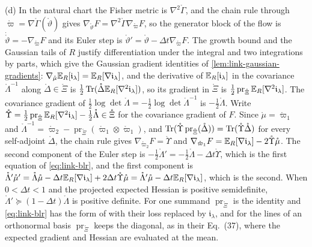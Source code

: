 (d) In the natural chart the Fisher metric is $\nabla^2\mathring\Gamma$, and the chain rule through
$\mathring\varpi=\nabla\mathring\Gamma(\mathring\vartheta)$ gives
$\nabla_{\mathring\vartheta}F=\nabla^2\mathring\Gamma\nabla_{\mathring\varpi}F$, so the generator block of
the flow is $\dot{\mathring\vartheta}=-\nabla_{\mathring\varpi}F$ and its Euler step is
$\mathring\vartheta'=\mathring\vartheta-\Delta t\nabla_{\mathring\varpi}F$. The growth bound and the
Gaussian tails of $R$ justify differentiation under the integral and two integrations by parts, which
give the Gaussian gradient identities of \cref{lem:link-gaussian-gradients}:
$\nabla_{\mathring\mu}\mathbb E_R[\mathfrak i_\lambda]=\mathbb E_R[\nabla\mathfrak i_\lambda]$, and the derivative of
$\mathbb E_R[\mathfrak i_\lambda]$ in the covariance $\mathring\Lambda^{-1}$ along $\mathring\Delta\in\mathring\Xi$ is
$\tfrac12\operatorname{Tr}(\mathring\Delta\mathbb E_R[\nabla^2\mathfrak i_\lambda])$, so its gradient in $\mathring\Xi$ is
$\tfrac12\operatorname{pr}_{\mathring\Xi}\mathbb E_R[\nabla^2\mathfrak i_\lambda]$. The covariance gradient of
$\tfrac12\log\det\mathring\Lambda=-\tfrac12\log\det\mathring\Lambda^{-1}$ is
$-\tfrac12\mathring\Lambda$. Write $\mathring\Upsilon=\tfrac12\operatorname{pr}_{\mathring\Xi}\mathbb E_R[\nabla^2\mathfrak i_\lambda]-\tfrac12\mathring\Lambda\in\mathring\Xi$
for the covariance gradient of $F$. Since $\mathring\mu=\mathring\varpi_1$ and
$\mathring\Lambda^{-1}=\mathring\varpi_2-\operatorname{pr}_{\mathring\Xi}(\mathring\varpi_1\otimes\mathring\varpi_1)$,
and $\operatorname{Tr}(\mathring\Upsilon\operatorname{pr}_{\mathring\Xi}(\mathring\Delta))=\operatorname{Tr}(\mathring\Upsilon\mathring\Delta)$
for every self-adjoint $\mathring\Delta$, the chain rule gives $\nabla_{\mathring\varpi_2}F=\mathring\Upsilon$ and
$\nabla_{\mathring\varpi_1}F=\mathbb E_R[\nabla\mathfrak i_\lambda]-2\mathring\Upsilon\mathring\mu$. The second component
of the Euler step is
$-\tfrac12\mathring\Lambda'=-\tfrac12\mathring\Lambda-\Delta t\mathring\Upsilon$, which is the first equation
of \eqref{eq:link-blr}, and the first component is
$\mathring\Lambda'\mathring\mu'=\mathring\Lambda\mathring\mu-\Delta t\mathbb E_R[\nabla\mathfrak i_\lambda]+2\Delta t\mathring\Upsilon\mathring\mu=\mathring\Lambda'\mathring\mu-\Delta t\mathbb E_R[\nabla\mathfrak i_\lambda]$,
which is the second. When $0<\Delta t<1$ and the projected expected Hessian is positive semidefinite,
$\mathring\Lambda'\succeq(1-\Delta t)\mathring\Lambda$ is positive definite. For one summand
$\operatorname{pr}_{\mathring\Xi}$ is the identity and \eqref{eq:link-blr} has the form of
\citet[Eq.~(12)]{KhanRue2023} with their loss replaced by $\mathfrak i_\lambda$, and for the lines of an
orthonormal basis $\operatorname{pr}_{\mathring\Xi}$ keeps the diagonal, as in their Eq.~(37), where the
expected gradient and Hessian are evaluated at the mean.

